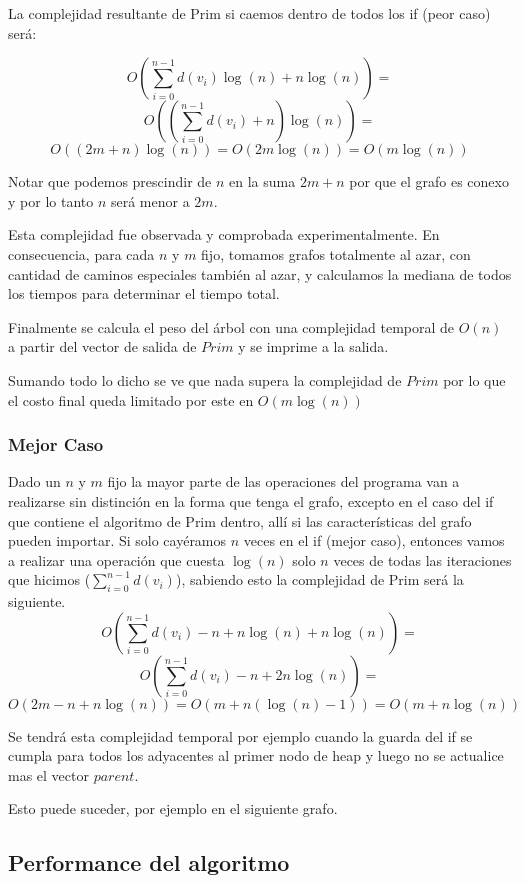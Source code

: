 La complejidad resultante de Prim si caemos dentro de todos los if (peor caso) será:

	$$O( \sum_{i=0}^{n-1}d(v_{i}) \log(n) + n \log(n) ) = $$
	$$O( (\sum_{i=0}^{n-1}d(v_{i}) + n) \log(n) ) = $$
	$$O( (2m + n) \log(n) ) = O( 2m \log(n) ) = O(m \log(n))$$ 

Notar que podemos prescindir de $n$ en la suma $2m+n$ por que el grafo es conexo y por lo tanto $n$ será menor a $2m$.

Esta complejidad fue observada y comprobada experimentalmente. En consecuencia, para cada $n$ y $m$ fijo, tomamos grafos totalmente al azar, con cantidad de caminos especiales también al azar, y calculamos la mediana de todos los tiempos para determinar el tiempo total.

Finalmente se calcula el peso del árbol con una complejidad temporal de $O(n)$ a partir del vector de salida de $Prim$ y se imprime a la salida.

Sumando todo lo dicho se ve que nada supera la complejidad de $Prim$ por lo que el costo final queda limitado por este en $O(m \log(n))$

\subsubsection{Mejor Caso}

Dado un $n$ y $m$ fijo la mayor parte de las operaciones del programa van a realizarse sin distinción en la forma que tenga el grafo, excepto en el caso del if que contiene el algoritmo de Prim dentro, allí si las características del grafo pueden importar. Si solo cay\'eramos $n$ veces en el if (mejor caso), entonces vamos a realizar una operación que cuesta $\log(n)$ solo $n$ veces de todas las iteraciones que hicimos ($\sum_{i=0}^{n-1}d(v_{i})$), sabiendo esto la complejidad de Prim será la siguiente.
	$$O( \sum_{i=0}^{n-1}d(v_{i}) - n + n \log(n) + n \log(n) ) = $$
	$$O( \sum_{i=0}^{n-1}d(v_{i}) - n + 2n \log(n) ) = $$
	$$O( 2m - n + n \log(n) ) = O( m + n (\log(n)-1) ) = O( m + n \log(n)) $$

Se tendrá esta complejidad temporal por ejemplo cuando la guarda del if se cumpla para todos los adyacentes al primer nodo de heap y luego no se actualice mas el vector $parent$.

Esto puede suceder, por ejemplo en el siguiente grafo.
	
\begin{figure}[H]
\centering
%
\end{figure}

\subsection{Performance del algoritmo}

